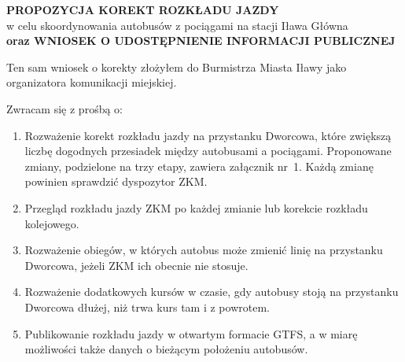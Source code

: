 



\begin{center}
{\large\bfseries PROPOZYCJA KOREKT ROZKŁADU JAZDY}\\[2pt]
w celu skoordynowania autobusów z pociągami na stacji Iława Główna\\[6pt]
{\large\bfseries oraz WNIOSEK O UDOSTĘPNIENIE INFORMACJI PUBLICZNEJ}
\end{center}

\Wstep{} Ten sam wniosek o korekty złożyłem do Burmistrza Miasta Iławy jako organizatora komunikacji miejskiej.


Zwracam się z prośbą o:
\begin{enumerate}
\item Rozważenie korekt rozkładu jazdy na przystanku Dworcowa, które zwiększą liczbę dogodnych przesiadek między autobusami a pociągami. Proponowane zmiany, podzielone na trzy etapy, zawiera załącznik nr~1. Każdą zmianę powinien sprawdzić dyspozytor ZKM.
\item Przegląd rozkładu jazdy ZKM po każdej zmianie lub korekcie rozkładu kolejowego.
\item Rozważenie obiegów, w których autobus może zmienić linię na przystanku Dworcowa, jeżeli ZKM ich obecnie nie stosuje.
\item Rozważenie dodatkowych kursów w czasie, gdy autobusy stoją na przystanku Dworcowa dłużej, niż trwa kurs tam i z powrotem.
\item Publikowanie rozkładu jazdy w otwartym formacie GTFS, a w miarę możliwości także danych o bieżącym położeniu autobusów.
\end{enumerate}

\Uzasadnienie


